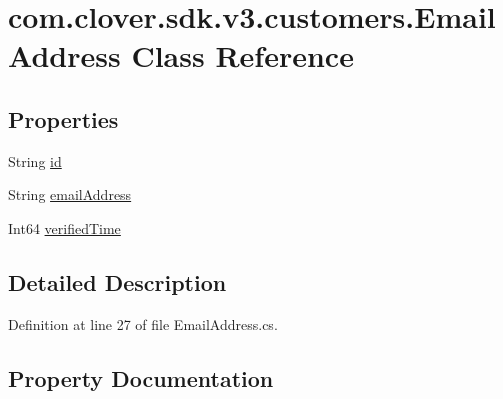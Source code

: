 \hypertarget{classcom_1_1clover_1_1sdk_1_1v3_1_1customers_1_1_email_address}{}\section{com.\+clover.\+sdk.\+v3.\+customers.\+Email\+Address Class Reference}
\label{classcom_1_1clover_1_1sdk_1_1v3_1_1customers_1_1_email_address}
\subsection*{Properties}
\begin{DoxyCompactItemize}
\item 
String \hyperlink{classcom_1_1clover_1_1sdk_1_1v3_1_1customers_1_1_email_address_a3dc876dfe3fb15ad3f8ba0c2d5d5835d}{id}
\item 
String \hyperlink{classcom_1_1clover_1_1sdk_1_1v3_1_1customers_1_1_email_address_ae7cc3a922b170bba56213e48b546be4e}{email\+Address}
\item 
Int64 \hyperlink{classcom_1_1clover_1_1sdk_1_1v3_1_1customers_1_1_email_address_ab66f35ccc4b6f8633c98d6ebfa8fa822}{verified\+Time}
\end{DoxyCompactItemize}


\subsection{Detailed Description}


Definition at line 27 of file Email\+Address.\+cs.



\subsection{Property Documentation}
\mbox{\label{classcom_1_1clover_1_1sdk_1_1v3_1_1customers_1_1_email_address_ae7cc3a922b170bba56213e48b546be4e}} 
